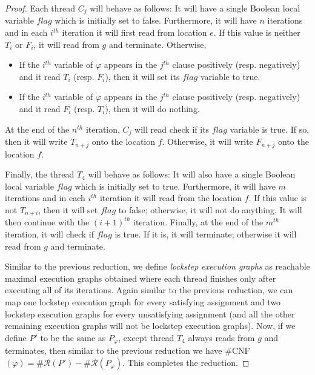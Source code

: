 \begin{proof}
    Each thread $C_j$ will behave as follows: It will have a single Boolean local variable $flag$ which is initially set to false. Furthermore, it will have $n$ iterations
    and in each $i^{th}$ iteration it will first read from location $e$.
    If this value is neither $T_i$ or $F_i$, it will read from $g$ and terminate.
    Otherwise, 
    \begin{itemize}
        \item If the $i^{th}$ variable of $\varphi$ appears in the $j^{th}$ clause positively (resp. negatively) and it read $T_i$ (resp. $F_i$), then it will 
        set its $flag$ variable to true.
        \item If the $i^{th}$ variable of $\varphi$ appears in the $j^{th}$ clause positively (resp. negatively) and it read $F_i$ (resp. $T_i$), then it will do nothing.
    \end{itemize}
    At the end of the $n^{th}$ iteration, $C_j$ will read check if its $flag$ variable is true.
    If so, then it will write $T_{n+j}$ onto the location $f$.
    Otherwise, it will write $F_{n+j}$ onto the location $f$.

    Finally, the thread $T_4$ will behave as follows: It will also have a single Boolean local variable $flag$ which is initially set to true. Furthermore, it will have $m$ iterations
    and in each $i^{th}$ iteration it will read from the location $f$.
    If this value is not $T_{n+i}$, then it will set $flag$ to false; otherwise, it will not do anything. It will then continue
    with the $(i+1)^{th}$ iteration.
    Finally, at the end of the $m^{th}$ iteration, it will check if $flag$ is true. 
    If it is, it will terminate; otherwise it will read from $g$ and terminate.

    Similar to the previous reduction, we define \emph{lockstep execution graphs}
    as reachable maximal execution graphs obtained where each thread finishes only after executing
    all of its iterations. Again similar to the previous reduction, we can 
    map one lockstep execution graph for every satisfying assignment
    and two lockstep execution graphs for every unsatisfying assignment
    (and all the other remaining execution graphs will not be lockstep execution graphs).
    Now, if we define $P'$ to be the same as $P_\varphi$, except thread $T_4$ always
    reads from $g$ and terminates, then similar to the previous reduction
    we have $\#$CNF$(\varphi) = \#\mathcal{R}(P') - \#\mathcal{R}(P_\varphi)$.
    This completes the reduction.
\end{proof}

